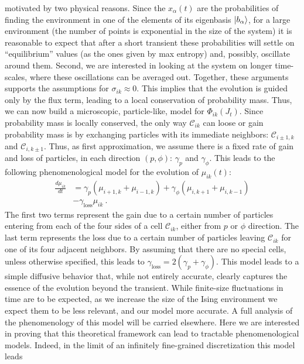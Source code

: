 \documentclass[%
 reprint,
 superscriptaddress,
 aps,
 pra,
]{revtex4-2}
\newcommand{\CC}[2]{\mathcal{C}_{#1 #2}}
\theoremstyle{definition}
\begin{document}
motivated by two physical reasons. Since the $x_\alpha(t)$ are the probabilities of 
finding the environment in one of the elements of its eigenbasis $\ket{b_\alpha}$, 
for a large environment (the number of points is exponential in the size of the system) 
it is reasonable to expect that after a short transient these probabilities will settle on 
``equilibrium'' values (as the ones given by max entropy) and, possibly, oscillate 
around them. Second, we are interested in looking at the system on longer time-scales, 
where these oscillations can be averaged out. Together, these arguments supports the
assumptions for $\sigma_{ik}\approx 0$. This implies that the evolution is guided only 
by the flux term, leading to a local conservation of probability mass. Thus, we can 
now build a microscopic, particle-like, model for $\Phi_{ik}(J_t)$.
Since probability mass is locally conserved, the only way $\CC{i}{k}$ can loose or 
gain probability mass is by exchanging particles with its immediate neighbors: $\CC{i\pm1,}{k}$ and $\CC{i,}{k\pm1}$. 
Thus, as first approximation, we assume there is a fixed rate of gain and loss of particles,
in each direction $(p,\phi)$: $\gamma_p$ and $\gamma_{\phi}$. This leads to 
the following phenomenological model for the evolution of $\mu_{ik}(t)$:
\begin{align}
\frac{d\mu_{ik}}{dt} &= \gamma_p \left( \mu_{i+1,k} + \mu_{i-1,k}\right) +\gamma_{\phi} \left( \mu_{i,k+1} + \mu_{i,k-1}\right) \nonumber \\
&- \gamma_{\mathrm{loss}}\mu_{ik}~.
\end{align}
The first two terms represent the gain due to a certain number of particles entering 
from each of the four sides of a cell $\mathcal{C}_{ik}$, either from $p$ or $\phi$ direction. 
The last term represents the loss due to a certain number of particles leaving $\CC{i}{k}$ 
for one of its four adjacent neighbors. By assuming that there are no special cells, unless otherwise 
specified, this leads to $\gamma_{\mathrm{loss}} = 2(\gamma_p+\gamma_{\phi})$.
This model leads to a simple diffusive behavior that, while not entirely accurate, 
clearly captures the essence of the evolution beyond the transient. While finite-size
fluctuations in time are to be expected, as we increase the size of the Ising environment
we expect them to be less relevant, and our model more accurate. A full analysis of 
the phenomenology of this model will be carried elsewhere. Here we are interested 
in proving that this theoretical framework can lead to tractable phenomenological 
models. Indeed, in the limit of an infinitely fine-grained discretization this model leads 
\end{document}
